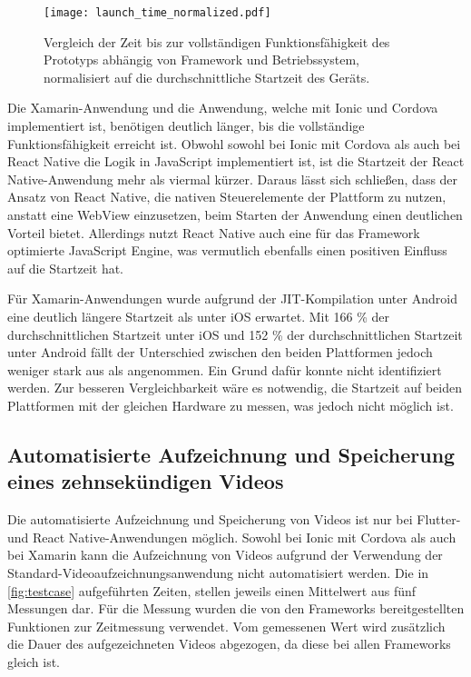 \begin{figure}[ht]
  \centering 
  \texttt{[image: launch\_time\_normalized.pdf]}
  \caption{Vergleich der Zeit bis zur vollständigen Funktionsfähigkeit des Prototyps abhängig von Framework und Betriebssystem, normalisiert auf die durchschnittliche Startzeit des Geräts.}
  \label{fig:launch_time_normalized}
\end{figure}
Die Xamarin-Anwendung und die Anwendung, welche mit Ionic und Cordova implementiert ist, benötigen deutlich länger, bis die vollständige Funktionsfähigkeit erreicht ist.
Obwohl sowohl bei Ionic mit Cordova als auch bei React Native die Logik in JavaScript implementiert ist, ist die Startzeit der React Native-Anwendung mehr als viermal kürzer.
Daraus lässt sich schließen, dass der Ansatz von React Native, die nativen Steuerelemente der Plattform zu nutzen, anstatt eine WebView einzusetzen, beim Starten der Anwendung einen deutlichen Vorteil bietet.
Allerdings nutzt React Native auch eine für das Framework optimierte JavaScript Engine, was vermutlich ebenfalls einen positiven Einfluss auf die Startzeit hat.

Für Xamarin-Anwendungen wurde aufgrund der \ac{JIT}-Kompilation unter Android eine deutlich längere Startzeit als unter iOS erwartet.
Mit 166 \% der durchschnittlichen Startzeit unter iOS und 152 \% der durchschnittlichen Startzeit unter Android fällt der Unterschied zwischen den beiden Plattformen jedoch weniger stark aus als angenommen.
Ein Grund dafür konnte nicht identifiziert werden.
Zur besseren Vergleichbarkeit wäre es notwendig, die Startzeit auf beiden Plattformen mit der gleichen Hardware zu messen, was jedoch nicht möglich ist.

\subsection{Automatisierte Aufzeichnung und Speicherung eines zehnsekündigen Videos}

Die automatisierte Aufzeichnung und Speicherung von Videos ist nur bei Flutter- und React Native-Anwendungen möglich.
Sowohl bei Ionic mit Cordova als auch bei Xamarin kann die Aufzeichnung von Videos aufgrund der Verwendung der Standard-Videoaufzeichnungsanwendung nicht automatisiert werden.
Die in \autoref{fig:testcase} aufgeführten Zeiten, stellen jeweils einen Mittelwert aus fünf Messungen dar.
Für die Messung wurden die von den Frameworks bereitgestellten Funktionen zur Zeitmessung verwendet.
Vom gemessenen Wert wird zusätzlich die Dauer des aufgezeichneten Videos abgezogen, da diese bei allen Frameworks gleich ist.

